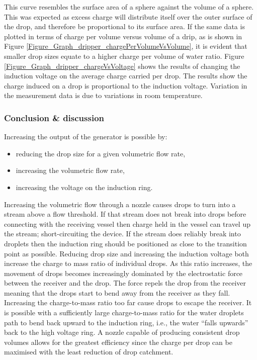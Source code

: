     This curve resembles the surface area of a sphere against the volume of a sphere.
    This was expected as excess charge will distribute itself over the outer surface of the drop, and therefore be proportional to its surface area.
    If the same data is plotted in terms of charge per volume versus volume of a drip, as is shown in Figure \ref{Figure_Graph_dripper_chargePerVolumeVsVolume}, it is evident that smaller drop sizes equate to a higher charge per volume of water ratio.
    Figure \ref{Figure_Graph_dripper_chargeVsVoltage} shows the results of changing the induction voltage on the average charge carried per drop.
    The results show the charge induced on a drop is proportional to the induction voltage.
    Variation in the measurement data is due to variations in room temperature.


  \subsubsection*{Conclusion \& discussion}

    Increasing the output of the generator is possible by:
    \begin{itemize}
    \item reducing the drop size for a given volumetric flow rate,
    \item increasing the volumetric flow rate,
    \item increasing the voltage on the induction ring.
    \end{itemize}
    Increasing the volumetric flow through a nozzle causes drops to turn into a stream above a flow threshold.
    If that stream does not break into drops before connecting with the receiving vessel then charge held in the vessel can travel up the stream; short-circuiting the device.
    If the stream does reliably break into droplets then the induction ring should be positioned as close to the transition point as possible.
    Reducing drop size and increasing the induction voltage both increase the charge to mass ratio of individual drops.
    As this ratio increases, the movement of drops becomes increasingly dominated by the electrostatic force between the receiver and the drop.
    The force repels the drop from the receiver meaning that the drops start to bend away from the receiver as they fall.
    Increasing the charge-to-mass ratio too far cause drops to escape the receiver.
    It is possible with a sufficiently large charge-to-mass ratio for the water droplets path to bend back upward to the induction ring, i.e., the water ``falls upwards'' back to the high voltage ring.
    A nozzle capable of producing consistent drop volumes allows for the greatest efficiency since the charge per drop can be maximised with the least reduction of drop catchment.

